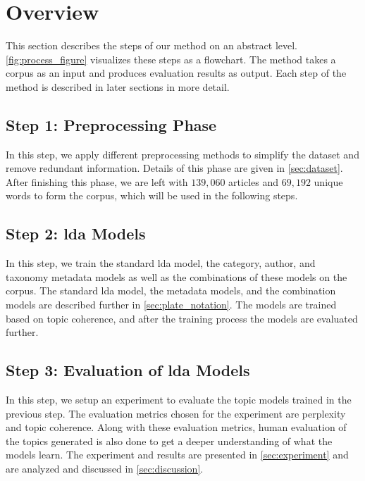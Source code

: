 \section{Overview}\label{sec:overview}
This section describes the steps of our method on an abstract level.
\autoref{fig:process_figure} visualizes these steps as a flowchart.
The method takes a corpus as an input and produces evaluation results as output.
Each step of the method is described in later sections in more detail.

\subsection*{Step 1: Preprocessing Phase}
In this step, we apply different preprocessing methods to simplify the dataset and remove redundant information.
Details of this phase are given in \autoref{sec:dataset}.
After finishing this phase, we are left with $139,060$ articles and $69,192$ unique words to form the corpus, which will be used in the following steps.

\subsection*{Step 2: \Gls{lda} Models}
In this step, we train the standard \gls{lda} model, the category, author, and taxonomy metadata models as well as the combinations of these models on the corpus.
The standard \gls{lda} model, the metadata models, and the combination models are described further in \autoref{sec:plate_notation}.
The models are trained based on topic coherence, and after the training process the models are evaluated further.

\subsection*{Step 3: Evaluation of \gls{lda} Models}
In this step, we setup an experiment to evaluate the topic models trained in the previous step.
The evaluation metrics chosen for the experiment are perplexity and topic coherence.
Along with these evaluation metrics, human evaluation of the topics generated is also done to get a deeper understanding of what the models learn.
The experiment and results are presented in \autoref{sec:experiment} and are analyzed and discussed in \autoref{sec:discussion}.



